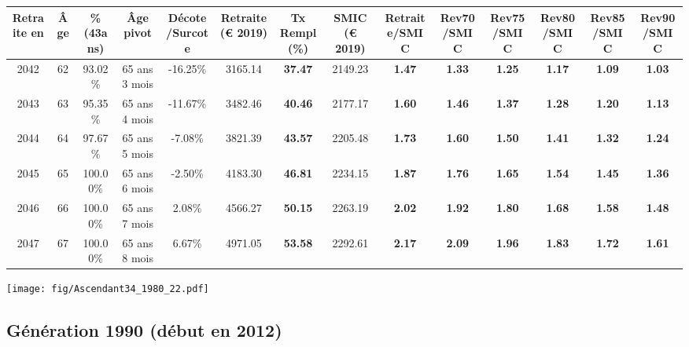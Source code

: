 \begin{adjustbox}{max width=\textwidth} 
\begin{tabular}[htb]{|c|c||c|c|c||c|c||c||c|c|c|c|c|c|} 
\hline 
 Retraite en &  Âge &  \%(43ans) &  Âge pivot &  Décote/Surcote &  Retraite (\euro{} 2019) &  Tx Rempl(\%) &  SMIC (\euro{} 2019) &  Retraite/SMIC &  Rev70/SMIC &  Rev75/SMIC &  Rev80/SMIC &  Rev85/SMIC &  Rev90/SMIC \\ 
\hline \hline 
 2042 &  62 &  93.02\% &  65 ans 3 mois &  -16.25\% &  3165.14 &  {\bf 37.47} &  2149.23 &  {\bf 1.47} &  {\bf 1.33} &  {\bf 1.25} &  {\bf 1.17} &  {\bf 1.09} &  {\bf 1.03} \\ 
\hline 
 2043 &  63 &  95.35\% &  65 ans 4 mois &  -11.67\% &  3482.46 &  {\bf 40.46} &  2177.17 &  {\bf 1.60} &  {\bf 1.46} &  {\bf 1.37} &  {\bf 1.28} &  {\bf 1.20} &  {\bf 1.13} \\ 
\hline 
 2044 &  64 &  97.67\% &  65 ans 5 mois &  -7.08\% &  3821.39 &  {\bf 43.57} &  2205.48 &  {\bf 1.73} &  {\bf 1.60} &  {\bf 1.50} &  {\bf 1.41} &  {\bf 1.32} &  {\bf 1.24} \\ 
\hline 
 2045 &  65 &  100.00\% &  65 ans 6 mois &  -2.50\% &  4183.30 &  {\bf 46.81} &  2234.15 &  {\bf 1.87} &  {\bf 1.76} &  {\bf 1.65} &  {\bf 1.54} &  {\bf 1.45} &  {\bf 1.36} \\ 
\hline 
 2046 &  66 &  100.00\% &  65 ans 7 mois &  2.08\% &  4566.27 &  {\bf 50.15} &  2263.19 &  {\bf 2.02} &  {\bf 1.92} &  {\bf 1.80} &  {\bf 1.68} &  {\bf 1.58} &  {\bf 1.48} \\ 
\hline 
 2047 &  67 &  100.00\% &  65 ans 8 mois &  6.67\% &  4971.05 &  {\bf 53.58} &  2292.61 &  {\bf 2.17} &  {\bf 2.09} &  {\bf 1.96} &  {\bf 1.83} &  {\bf 1.72} &  {\bf 1.61} \\ 
\hline 
\hline 
\end{tabular} 
\end{adjustbox} 
 
 \vspace{0.1cm} 

 \begin{center}\texttt{[image: fig/Ascendant34\_1980\_22.pdf]}\end{center} \label{fig/Ascendant34_1980_22.pdf} 

\newpage 
 
\subsection{Génération 1990 (début en 2012)} 

